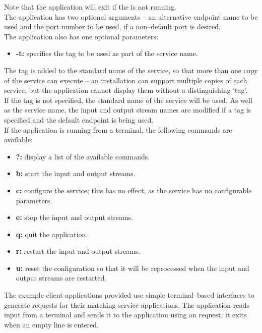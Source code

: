 Note that the application will exit if the
 is not running.\\

The application has two optional arguments -- an alternative endpoint name to be used and
the port number to be used, if a non--default port is desired.\\

The application also has one optional parameters:
\begin{itemize}
\item \textbf{-t:} specifies the tag to be used as part of the service name.
\end{itemize}
The tag is added to the standard name of the service, so that more than one copy of the
service can execute -- an \mplusm{} installation can support multiple copies of each
 service, but the 
application cannot display them without a distinguishing `tag'.\\
If the tag is not specified, the standard name of the service will be used.
As well as the service name, the input and output stream names are modified if a tag is
specified and the default endpoint is being used.\\

If the application is running from a terminal, the following commands are available:
\begin{itemize}
\item \textbf{?:} display a list of the available commands.
\item \textbf{b:} start the input and output streams. 
\item \textbf{c:} configure the service; this has no effect, as the service has no
configurable parameters. 
\item \textbf{e:} stop the input and output streams. 
\item \textbf{q:} quit the application. 
\item \textbf{r:} restart the input and output streams.
\item \textbf{u:} reset the configuration so that it will be reprocessed when the input
and output streams are restarted. 
\end{itemize}
\secondaryEnd{}
The example client applications provided use simple terminal--based interfaces to
generate requests for their matching service applications.
The  application reads input from a terminal and
sends it to the  application using an
 request; it exits when an empty line is
entered.\\

